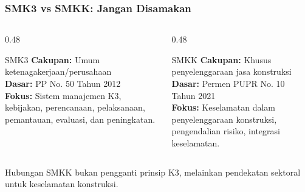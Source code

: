 \documentclass[../main.tex]{subfiles}
\begin{document}
\begin{frame}[mytitle=center,t,mycolor=digiPH_gray!20]
	\frametitle{SMK3 vs SMKK: Jangan Disamakan}

	\begin{columns}[t]
		\begin{column}{0.48\textwidth}
			\begin{block}{SMK3}
				\textbf{Cakupan:} Umum ketenagakerjaan/perusahaan\\
				\textbf{Dasar:} PP No. 50 Tahun 2012\\
				\textbf{Fokus:} Sistem manajemen K3, kebijakan, perencanaan, pelaksanaan, pemantauan, evaluasi, dan peningkatan.
			\end{block}
		\end{column}

		\begin{column}{0.48\textwidth}
			\begin{block}{SMKK}
				\textbf{Cakupan:} Khusus penyelenggaraan jasa konstruksi\\
				\textbf{Dasar:} Permen PUPR No. 10 Tahun 2021\\
				\textbf{Fokus:} Keselamatan dalam penyelenggaraan konstruksi, pengendalian risiko, integrasi keselamatan.
			\end{block}
		\end{column}
	\end{columns}

	\vspace{0.2cm}
	\begin{alertblock}{Hubungan}
		SMKK bukan pengganti prinsip K3, melainkan pendekatan sektoral untuk keselamatan konstruksi.
	\end{alertblock}
\end{frame}
\end{document}
